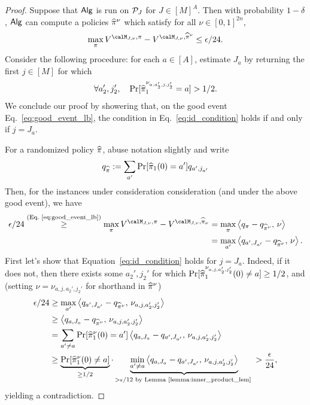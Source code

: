 \begin{proof} Suppose that $\mathsf{Alg}$ is run on $\mathcal{P}_J$ for $J \in [M]^A$. Then with probability $1-\delta$, $\mathsf{Alg}$ can compute a policies $\widehat{\pi}^{\nu}$ which satisfy for all $\nu \in [0,1]^{2n}$, 
\begin{align}
\max_{\pi} V^{\calM_{J,\nu}, \pi} - V^{\calM_{J,\nu},\pihat^{\nu}} \le \epsilon/24. \label{eq:good_event_lb}
\end{align}
Consider the following procedure: for each $a \in [A]$, estimate $J_a$ by returning the first $j \in [M]$ for which
\begin{align}
\forall a_2',j_2', \quad \Pr[\widehat{\pi}_1^{\nu_{a,a_2',j,j_2'}} = a ] > 1/2.\label{eq:id_condition}
\end{align}
We conclude our proof by showering that, on the good event Eq.~\eqref{eq:good_event_lb}, the condition in Eq.~\eqref{eq:id_condition} holds if and only if $j = J_a$.


For a randomized policy $\widehat{\pi}$, abuse notation slightly and write 
\begin{align*}
q_{\widehat{\pi}} := \sum_{a'} \Pr[\widehat{\pi}_1(0)= a']q_{a',j_{a'}}
\end{align*}
Then, for the instances under consideration consideration (and under the above good event), we have
\begin{align*}
\epsilon/24 \overset{\text{(Eq.~\ref{eq:good_event_lb})}}{\ge} \max_{\pi} V^{\calM_{J,\nu}, \pi} - V^{\calM_{J,\nu},\pihat_{\nu}} &= \max_{\pi}\left\langle q_{\pi} - q_{\pihat^{\nu}} , \,\nu\right\rangle\\
&= \max_{a'}\left\langle q_{a',J_{a'}} - q_{\pihat^{\nu}} , \,\nu\right\rangle.
\end{align*} 
First let's show that Equation~\ref{eq:id_condition} holds for $j = J_a$. Indeed, if it does not, then there exists some $a_2',j_2'$ for which $\Pr[\widehat{\pi}_1^{\nu_{a,j,a_2',j_2'}}(0) \ne a] \ge 1/2$, and (setting $\nu = \nu_{a,j,a_2',j_2'}$ for shorthand in $\widehat{\pi}^{\nu}$)
\begin{align*}
\epsilon/24 &\ge \max_{a'}\left\langle q_{a',J_{a'}} - q_{\widehat{\pi}^{\nu}} , \,\nu_{a,j,a_2',j_2'}\right\rangle\\
&\ge \left\langle q_{a,J_{a}} - q_{\widehat{\pi}^{\nu}} , \,\nu_{a,j,a_2',j_2'}\right\rangle\\
&= \sum_{a' \ne a}\Pr[\widehat{\pi}^{\nu}_1(0) = a'] \left\langle q_{a,J_{a}} - q_{a',J_{a'}} , \,\nu_{a,j,a_2',j_2'}\right\rangle\\
&\ge\underbrace{\Pr[\widehat{\pi}^{\nu}_1(0) \ne a]}_{\ge 1/2} \cdot \underbrace{\min_{a' \ne a}\left\langle q_{a,J_{a}} - q_{a',J_{a'}} , \,\nu_{a,j,a_2',j_2'}\right\rangle}_{> \epsilon/12 \text{ by Lemma~\ref{lemma:inner_product_lem} }} > \frac{\epsilon}{24},
\end{align*}
yielding a contradiction. 


\end{proof}
